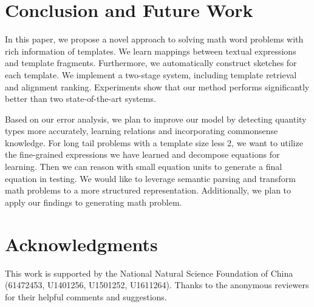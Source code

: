 \documentclass[11pt,letterpaper]{article}
\begin{document}
\section{Conclusion and Future Work}
\label{sec:conclusion}
In this paper, we propose a novel approach to solving math word problems with rich information of templates. We learn mappings between textual expressions and template fragments. Furthermore, we automatically construct sketches for each template. We implement a two-stage system, including template retrieval and alignment ranking. Experiments show that our method performs significantly better than two state-of-the-art systems.

Based on our error analysis, we plan to improve our model by detecting quantity types more accurately, learning relations and incorporating commonsense knowledge. For long tail problems with a template size less 2, we want to utilize the fine-grained expressions we have learned and decompose equations for learning. Then we can reason with small equation units to generate a final equation in testing. We would like to leverage semantic parsing and transform math problems to a more structured representation. Additionally, we plan to apply our findings to generating math problem.

\section{Acknowledgments}

This work is supported by the National Natural Science Foundation of China (61472453, U1401256, U1501252, U1611264). Thanks to the anonymous reviewers for their helpful comments and suggestions.



\end{document}
